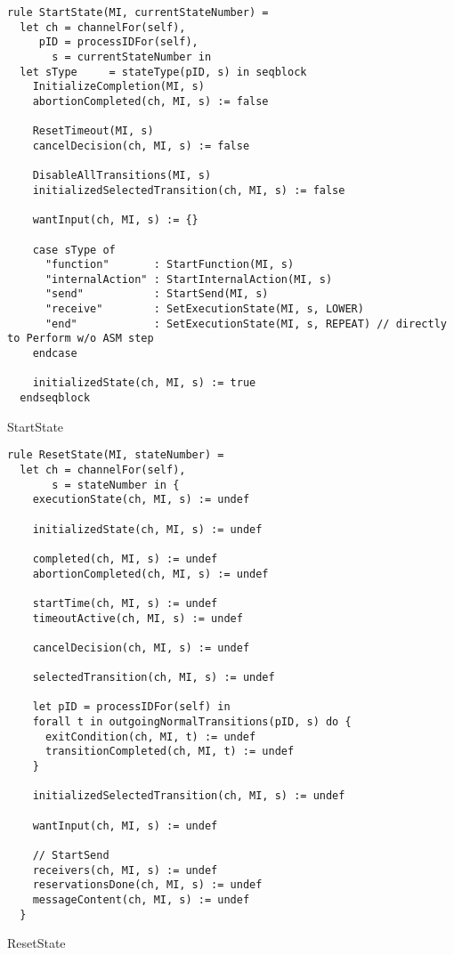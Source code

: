 \begin{listing}[H]
\begin{verbatim}
rule StartState(MI, currentStateNumber) =
  let ch = channelFor(self),
     pID = processIDFor(self),
       s = currentStateNumber in
  let sType     = stateType(pID, s) in seqblock
    InitializeCompletion(MI, s)
    abortionCompleted(ch, MI, s) := false

    ResetTimeout(MI, s)
    cancelDecision(ch, MI, s) := false

    DisableAllTransitions(MI, s)
    initializedSelectedTransition(ch, MI, s) := false

    wantInput(ch, MI, s) := {}

    case sType of
      "function"       : StartFunction(MI, s)
      "internalAction" : StartInternalAction(MI, s)
      "send"           : StartSend(MI, s)
      "receive"        : SetExecutionState(MI, s, LOWER)
      "end"            : SetExecutionState(MI, s, REPEAT) // directly to Perform w/o ASM step
    endcase

    initializedState(ch, MI, s) := true
  endseqblock
\end{verbatim}
\caption{StartState}
\label{lst:asm:StartState}
\end{listing}




\begin{listing}[H]
\begin{verbatim}
rule ResetState(MI, stateNumber) =
  let ch = channelFor(self),
       s = stateNumber in {
    executionState(ch, MI, s) := undef

    initializedState(ch, MI, s) := undef

    completed(ch, MI, s) := undef
    abortionCompleted(ch, MI, s) := undef

    startTime(ch, MI, s) := undef
    timeoutActive(ch, MI, s) := undef

    cancelDecision(ch, MI, s) := undef

    selectedTransition(ch, MI, s) := undef

    let pID = processIDFor(self) in
    forall t in outgoingNormalTransitions(pID, s) do {
      exitCondition(ch, MI, t) := undef
      transitionCompleted(ch, MI, t) := undef
    }

    initializedSelectedTransition(ch, MI, s) := undef

    wantInput(ch, MI, s) := undef

    // StartSend
    receivers(ch, MI, s) := undef
    reservationsDone(ch, MI, s) := undef
    messageContent(ch, MI, s) := undef
  }
\end{verbatim}
\caption{ResetState}
\label{lst:asm:ResetState}
\end{listing}




